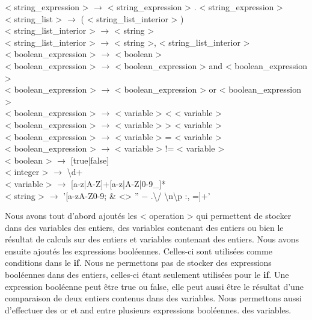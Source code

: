 \documentclass[a4paper,10pt]{article}
\begin{document}
{< string\_expression > $\rightarrow$ < string\_expression > . < string\_expression > \\
< string\_list > $\rightarrow$ ( < string\_list\_interior > ) \\
< string\_list\_interior > $\rightarrow$ < string >\\
< string\_list\_interior > $\rightarrow$ < string >, < string\_list\_interior > \\
< boolean\_expression > $\rightarrow$ < boolean > \\
< boolean\_expression > $\rightarrow$ < boolean\_expression > and < boolean\_expression > \\
< boolean\_expression > $\rightarrow$ < boolean\_expression > or < boolean\_expression > \\
< boolean\_expression > $\rightarrow$ < variable > < < variable >\\
< boolean\_expression > $\rightarrow$ < variable > > < variable >\\
< boolean\_expression > $\rightarrow$ < variable > = < variable >\\
< boolean\_expression > $\rightarrow$ < variable > != < variable >\\
< boolean > $\rightarrow$ [true|false]\\
< integer > $\rightarrow$ \textbackslash d+\\
< variable > $\rightarrow$ [a-z|A-Z]+[a-z|A-Z|0-9\_]*\\
< string > $\rightarrow$ '[a-zA-Z0-9; \& <> ” − .\textbackslash / \textbackslash n\textbackslash p :, =]+' \\
}

Nous avons tout d'abord ajoutés les < operation > qui permettent de stocker dans des variables des entiers, des variables contenant des entiers ou bien le résultat
de calculs sur des entiers et variables contenant des entiers. Nous avons ensuite ajoutés les expressions booléennes. Celles-ci sont utilisées comme conditions dans 
le \textbf{if}. Nous ne permettons pas de stocker des expressions booléennes dans des entiers, celles-ci étant seulement utilisées pour le \textbf{if}. Une expression
booléenne peut être \textrm{true} ou \textrm{false}, elle peut aussi être le résultat d'une comparaison de deux entiers contenus dans des variables. Nous permettons
aussi d'effectuer des \textrm{or} et \textrm{and} entre plusieurs expressions booléennes. 
des variables.
\end{document}
